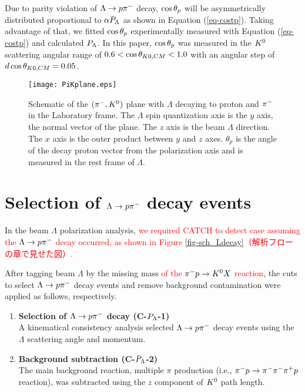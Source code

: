 Due to parity violation of $\Lambda\to p\pi^{-}$ decay, $\cos{\theta_p}$ will be asymmetrically distributed proportional to $\alpha P_{\Lambda}$ \cite{Lee1957} as shown in Equation (\ref{eq-costp}). Taking advantage of that, we fitted $\cos{\theta_p}$ experimentally measured with Equation (\ref{eq-costp}) and calculated $P_{\Lambda}$. In this paper, $\cos{\theta_p}$ was measured in the $K^{0}$ scattering angular range of $0.6<\cos{\theta_{K0,CM}}<1.0$ with an angular step of $d\cos{\theta_{K0,CM}} = 0.05$.


\begin{figure}[h]
  \centering
  \texttt{[image: PiKplane.eps]}
  \caption{Schematic of the $(\pi^-,K^0)$ plane with $\Lambda$ decaying to proton and $\pi^{-}$ in the Laboratory frame. The $\Lambda$ spin quantization axis is the $y$ axis, the normal vector of the plane. The $z$ axis is the beam $\Lambda$ direction. The $x$ axis is the outer product between $y$ and $z$ axes. $\theta_p$ is the angle of the decay proton vector from the polarization axis and is measured in the rest frame of $\Lambda$.}
  \label{fig-PiKplane}
\end{figure}


\clearpage
\section{Selection of $\Lambda\to p\pi^{-}$ decay events}
\label{sec-Pl-evsele}

In the beam $\Lambda$ polarization analysis, \textcolor{red}{ we required CATCH to detect case  assuming the $\Lambda\to p\pi^{-}$ decay occurred, as shown in Figure \ref{fig-sch_Ldecay}（解析フローの章で見せた図）. } %

After tagging beam $\Lambda$ by the missing mass \textcolor{red}{of the $\pi^- p \to K^0 X$ reaction}, the cuts to select $\Lambda\to p\pi^{-}$ decay events and remove background contamination were applied as follows, respectively. 


\begin{enumerate}
  \item {\bf Selection of $\Lambda\to p\pi^{-}$ decay ({\bf C-$P_{\Lambda}$-1}) } \\
  A kinematical consistency analysis selected $\Lambda\to p\pi^{-}$ decay events using the $\Lambda$ scattering angle and momentum.
  \item {\bf Background subtraction ({\bf C-$P_{\Lambda}$-2}) } \\
  The main background reaction, multiple $\pi$ production (i.e., $\pi^- p \to \pi^-\pi^-\pi^+p$ reaction), was subtracted using the $z$ component of $K^{0}$ path length. 
\end{enumerate}

